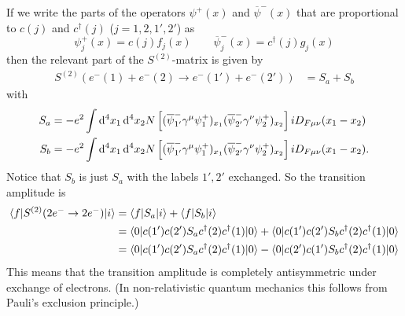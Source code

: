 \begin{itemize}
\begin{itemize}
If we write the parts of the operators $\psi^+(x)$ and $\overline{\psi}^-(x)$ that are proportional to $c(j)$ and $c^\dagger(j)$ ($j=1,2,1',2'$) as
\[ \psi^+_j(x) = c(j)f_j(x) \qquad \overline{\psi}_j^-(x) = c^\dagger(j)g_j(x) \]
then the relevant part of the $S^{(2)}$-matrix is given by
\begin{align*}
S^{(2)}(e^-(1) + e^-(2) \to e^-(1') + e^-(2')) &= S_a + S_b
\end{align*}
with
\begin{align*}
S_a &= -e^2\int \operatorname{d \!}{^4x_1}\operatorname{d \!}{^4x_2}N \left[(\overline{\psi}^-_{1'}\gamma^\mu\psi^+_1)_{x_1}(\overline{\psi}^-_{2'}\gamma^\nu\psi^+_2)_{x_2}\right]iD_{F\mu\nu}(x_1-x_2) \\
S_b &= -e^2\int \operatorname{d \!}{^4x_1}\operatorname{d \!}{^4x_2}N \left[(\overline{\psi}^-_{1'}\gamma^\mu\psi^+_1)_{x_1}(\overline{\psi}^-_{2'}\gamma^\nu\psi^+_2)_{x_2}\right]iD_{F\mu\nu}(x_1-x_2).
\end{align*}
Notice that $S_b$ is just $S_a$ with the labels $1', 2'$ exchanged. So the transition amplitude is
\begin{align*}
\braket[S^{(2)}(2e^-\to 2e^-)]{f}{i} &= \braket[S_a]{f}{i} + \braket[S_b]{f}{i} \\
&= \braket[c(1')c(2')S_a c^\dagger(2)c^\dagger(1)]{0}{0} + \braket[c(1')c(2')S_b c^\dagger(2)c^\dagger(1)]{0}{0} \\
&= \braket[c(1')c(2')S_a c^\dagger(2)c^\dagger(1)]{0}{0} - \braket[c(2')c(1')S_b c^\dagger(2)c^\dagger(1)]{0}{0}
\end{align*}
This means that the transition amplitude is completely antisymmetric under exchange of electrons. (In non-relativistic quantum mechanics this follows from Pauli's exclusion principle.)


\end{itemize}
\end{itemize}
